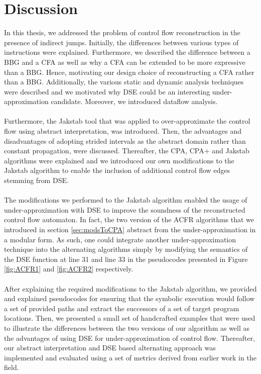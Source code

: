 \documentclass{kththesis}
\begin{document}
\section{Discussion}
In this thesis, we addressed the problem of control flow reconstruction in the presence of indirect jumps. Initially, the differences between various types of instructions were explained. Furthermore, we described the difference between a BBG and a CFA as well as why a CFA can be extended to be more expressive than a BBG. Hence, motivating our design choice of reconstructing a CFA rather than a BBG. Additionally, the various static and dynamic analysis techniques were described and we motivated why DSE could be an interesting under-approximation candidate. Moreover, we introduced dataflow analysis.
\\ \\
Furthermore, the Jakstab tool that was applied to over-approximate the control flow using abstract interpretation, was introduced. Then, the advantages and disadvantages of adopting strided intervals as the abstract domain rather than constant propagation, were discussed. Thereafter, the CPA, CPA+ and Jakstab algorithms were explained and we introduced our own modifications to the Jakstab algorithm to enable the inclusion of additional control flow edges stemming from DSE.
\\ \\ 
The modifications we performed to the Jakstab algorithm enabled the usage of under-approximation with DSE to improve the soundness of the reconstructed control flow automaton. In fact, the two version of the ACFR algorithms that we introduced in section \ref{sec:modsToCPA} abstract from the under-approximation in a modular form. As such, one could integrate another under-approximation technique into the alternating algorithms simply by modifying the semantics of the DSE function at line 31 and line 33 in the pseudocodes presented in Figure \ref{fig:ACFR1} and \ref{fig:ACFR2} respectively.
\\ \\
After explaining the required modifications to the Jakstab algorithm, we provided and explained pseudocodes for ensuring that the symbolic execution would follow a set of provided paths and extract the successors of a set of target program locations. Then, we presented a small set of handcrafted examples that were used to illustrate the differences between the two versions of our algorithm as well as the advantages of using DSE for under-approximation of control flow. Thereafter, our abstract interpretation and DSE based alternating approach was implemented and evaluated using a set of metrics derived from earlier work in the field.
\end{document}
